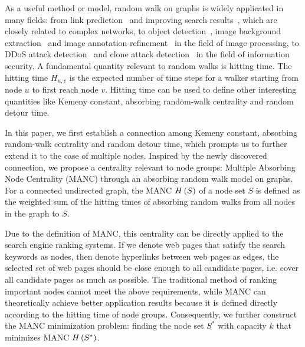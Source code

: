 \documentclass[sigconf]{acmart}
\begin{document}
As a useful method or model, random walk on graphs is widely applicated in many fields: from link prediction~\cite{YiGuWeTiHa10} and improving search results~\cite{LiPeMaQiWeQi10}, which are closely related to complex networks, to object detection~\cite{GoViHuRa10}, image background extraction~\cite{HuWaYeChLa16} and image annotation refinement~\cite{WaJiZhZh10} in the field of image processing, to DDoS attack detection~\cite{XuZhXiYu14} and clone attack detection~\cite{ZeCaZhGuXi10} in the field of information security.
A fundamental quantity relevant to random walks is hitting time.
The hitting time \(H_{u,v}\) is the expected number of time steps for a walker starting from node \(u\) to first reach node \(v\).
Hitting time can be used to define other interesting quantities like Kemeny constant, absorbing random-walk centrality and random detour time.

In this paper, we first establish a connection among Kemeny constant, absorbing random-walk centrality and random detour time, which prompts us to further extend it to the case of multiple nodes.
Inspired by the newly discovered connection, we propose a centrality relevant to node groups: Multiple Absorbing Node Centrality (MANC) through an absorbing random walk model on graphs.
For a connected undirected graph, the MANC \(H\left(S\right)\) of a node set \(S\) is defined as the weighted sum of the hitting times of absorbing random walks from all nodes in the graph to \(S\).

Due to the definition of MANC, this centrality can be directly applied to the search engine ranking systems.
If we denote web pages that satisfy the search keywords as nodes, then denote hyperlinks between web pages as edges, the selected set of web pages should be close enough to all candidate pages, i.e. cover all candidate pages as much as possible.
The traditional method of ranking important nodes cannot meet the above requirements, while MANC can theoretically achieve better application results because it is defined directly according to the hitting time of node groups.
Consequently, we further construct the MANC minimization problem: finding the node set \(S^*\) with capacity \(k\) that minimizes MANC \(H\left(S^*\right)\).
\end{document}
